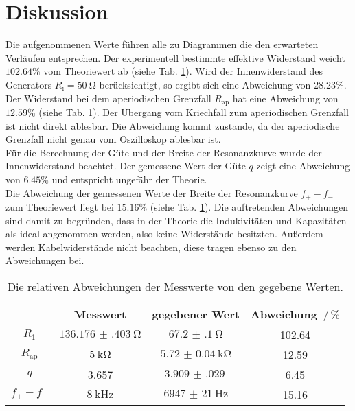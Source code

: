 \section{Diskussion}
\label{sec:Diskussion}
Die aufgenommenen Werte führen alle zu Diagrammen die den erwarteten Verläufen entsprechen.
Der experimentell bestimmte effektive Widerstand weicht $102.64 \%$ vom Theoriewert ab (siehe Tab. \ref{tab:fehler}).
Wird der Innenwiderstand des Generators $R_\text{i}=\SI{50}{\ohm}$ berücksichtigt, so ergibt sich eine Abweichung von $28.23 \%$.
\\
Der Widerstand bei dem aperiodischen Grenzfall $R_\text{ap}$ hat eine Abweichung von $12.59 \%$ (siehe Tab. \ref{tab:fehler}).
Der Übergang vom Kriechfall zum aperiodischen Grenzfall ist nicht direkt ablesbar.
Die Abweichung kommt zustande, da der aperiodische Grenzfall nicht genau vom Oszilloskop ablesbar ist.
\\
Für die Berechnung der Güte und der Breite der Resonanzkurve wurde der Innenwiderstand beachtet.
Der gemessene Wert der Güte $q$ zeigt eine Abweichung von $6.45 \%$ und entspricht ungefähr der Theorie.
\\
Die Abweichung der gemessenen Werte der Breite der Resonanzkurve $f_+ - f_-$ zum Theoriewert liegt bei $15.16 \%$ (siehe Tab. \ref{tab:fehler}).
Die auftretenden Abweichungen sind damit zu begründen, dass in der Theorie die Indukivitäten und Kapazitäten als ideal angenommen werden, also keine Widerstände besitzten.
Außerdem werden Kabelwiderstände nicht beachten, diese tragen ebenso zu den Abweichungen bei.
\\

\begin{table}
\centering
\caption{Die relativen Abweichungen der Messwerte von den gegebene Werten.}
\begin{tabular}{cccc}
\toprule
 & Messwert & gegebener Wert & Abweichung $ \,/\, \%$ \\
\midrule
$R_1$ &  $\SI{136.176(403)}{\ohm}$ & $\SI{67.2(1)}{\ohm}$ & 102.64 \\
$R_\text{ap}$ & $\SI{5}{\kilo\ohm}$ & $\SI{5.72(4)}{\kilo\ohm}$ & 12.59 \\
$q$ & 3.657 & $\SI{3.909(029)}{}$ & 6.45 \\
$f_{+}- f_{-}$ & $\SI{8}{\kilo\hertz}$ & $\SI{6947(21)}{\hertz}$ & 15.16 \\
\bottomrule
\end{tabular}
\label{tab:fehler}
\end{table}